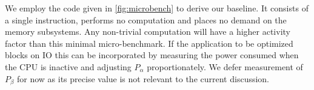 We employ the code given in \autoref{fig:microbench} to derive our baseline.  It consists of a single instruction, performs no computation and places no demand on the memory subsystems. Any non-trivial computation will have a higher activity factor than this minimal micro-benchmark. If the application to be optimized blocks on IO this can be incorporated by measuring the power consumed when the CPU is inactive and adjusting $P_\alpha$ proportionately. We defer measurement of $P_{\beta}$ for now as its precise value is not relevant to the current discussion. 
